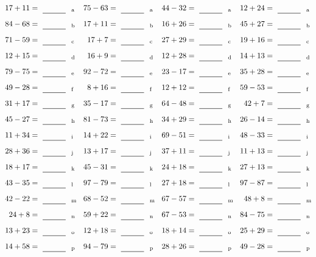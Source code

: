 \documentclass
[
  draft    = true,
  fontsize = 11pt,
  parskip  = half-
]
{scrartcl}
\begin{document}
\clearpage
\begin{align*}
    \pline{17+11}&=\rline{a}
  & \pline{75-63}&=\rline{a}
  & \pline{44-32}&=\rline{a}
  & \pline{12+24}&=\rline{a} \\[1ex]
    \pline{84-68}&=\rline{b}
  & \pline{17+11}&=\rline{b}
  & \pline{16+26}&=\rline{b}
  & \pline{45+27}&=\rline{b} \\[1ex]
    \pline{71-59}&=\rline{c}
  & \pline{17+7}&=\rline{c}
  & \pline{27+29}&=\rline{c}
  & \pline{19+16}&=\rline{c} \\[1ex]
    \pline{12+15}&=\rline{d}
  & \pline{16+9}&=\rline{d}
  & \pline{12+28}&=\rline{d}
  & \pline{14+13}&=\rline{d} \\[1ex]
    \pline{79-75}&=\rline{e}
  & \pline{92-72}&=\rline{e}
  & \pline{23-17}&=\rline{e}
  & \pline{35+28}&=\rline{e} \\[1ex]
    \pline{49-28}&=\rline{f}
  & \pline{8+16}&=\rline{f}
  & \pline{12+12}&=\rline{f}
  & \pline{59-53}&=\rline{f} \\[1ex]
    \pline{31+17}&=\rline{g}
  & \pline{35-17}&=\rline{g}
  & \pline{64-48}&=\rline{g}
  & \pline{42+7}&=\rline{g} \\[1ex]
    \pline{45-27}&=\rline{h}
  & \pline{81-73}&=\rline{h}
  & \pline{34+29}&=\rline{h}
  & \pline{26-14}&=\rline{h} \\[1ex]
    \pline{11+34}&=\rline{i}
  & \pline{14+22}&=\rline{i}
  & \pline{69-51}&=\rline{i}
  & \pline{48-33}&=\rline{i} \\[1ex]
    \pline{28+36}&=\rline{j}
  & \pline{13+17}&=\rline{j}
  & \pline{37+11}&=\rline{j}
  & \pline{11+13}&=\rline{j} \\[1ex]
    \pline{18+17}&=\rline{k}
  & \pline{45-31}&=\rline{k}
  & \pline{24+18}&=\rline{k}
  & \pline{27+13}&=\rline{k} \\[1ex]
    \pline{43-35}&=\rline{l}
  & \pline{97-79}&=\rline{l}
  & \pline{27+18}&=\rline{l}
  & \pline{97-87}&=\rline{l} \\[1ex]
    \pline{42-22}&=\rline{m}
  & \pline{68-52}&=\rline{m}
  & \pline{67-57}&=\rline{m}
  & \pline{48+8}&=\rline{m} \\[1ex]
    \pline{24+8}&=\rline{n}
  & \pline{59+22}&=\rline{n}
  & \pline{67-53}&=\rline{n}
  & \pline{84-75}&=\rline{n} \\[1ex]
    \pline{13+23}&=\rline{o}
  & \pline{12+18}&=\rline{o}
  & \pline{18+14}&=\rline{o}
  & \pline{25+29}&=\rline{o} \\[1ex]
    \pline{14+58}&=\rline{p}
  & \pline{94-79}&=\rline{p}
  & \pline{28+26}&=\rline{p}
  & \pline{49-28}&=\rline{p}
\end{align*}
\end{document}
